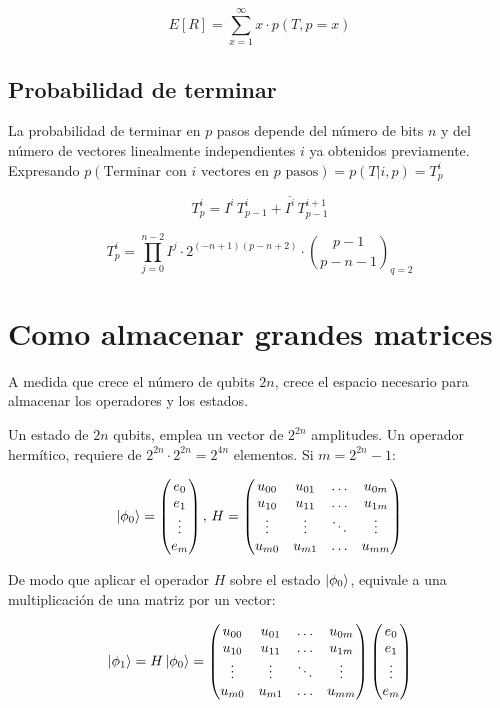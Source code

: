 \documentclass{article}
\newcommand*\mat[1]{ \begin{pmatrix} #1 \end{pmatrix}}
\theoremstyle{definition}
\begin{document}
$$ E[R] = \sum^{\infty}_{x=1} x \cdot p(T, p=x) $$

\subsection{Probabilidad de terminar}

La probabilidad de terminar en $p$ pasos depende del número de bits $n$ y del 
número de vectores linealmente independientes $i$ ya obtenidos previamente.  
Expresando $p(\textrm{Terminar con $i$ vectores en $p$ pasos}) = p(T|i,p) = 
T^i_p$ 

$$T^i_p = I^i \, T^i_{p-1} + \overline{I^i} \, T^{i+1}_{p-1}$$

$$ T^i_p = \prod^{n-2}_{j=0} I^j \cdot 2^{(-n+1)(p-n+2)} \cdot {p-1 \choose 
p-n-1}_{q=2} $$

\section{Como almacenar grandes matrices}
A medida que crece el número de qubits $2n$, crece el espacio necesario para 
almacenar los operadores y los estados.

Un estado de $2n$ qubits, emplea un vector de $2^{2n}$ amplitudes. Un operador 
hermítico, requiere de $2^{2n} \cdot 2^{2n} = 2^{4n}$ elementos. Si $m = 
2^{2n}-1$:

$$ \ket{\phi_0} = \mat{e_0 \\ e_1 \\ \vdots \\ e_m},\, H =
	\mat{ u_{00} & u_{01} & \ldots & u_{0m} \\
		u_{10} & u_{11} & \ldots & u_{1m}\\
		\vdots & \vdots & \ddots & \vdots \\
		u_{m0} & u_{m1} & \ldots & u_{mm}\\
	}
$$

De modo que aplicar el operador $H$ sobre el estado $\ket{\phi_0}$, equivale a 
una multiplicación de una matriz por un vector:

$$ \ket{\phi_1} =
	H \ket{\phi_0} = \mat{ u_{00} & u_{01} & \ldots & u_{0m} \\
		u_{10} & u_{11} & \ldots & u_{1m}\\
		\vdots & \vdots & \ddots & \vdots \\
		u_{m0} & u_{m1} & \ldots & u_{mm}\\
	}
	\mat{e_0 \\ e_1 \\ \vdots \\ e_m}
$$
\end{document}
